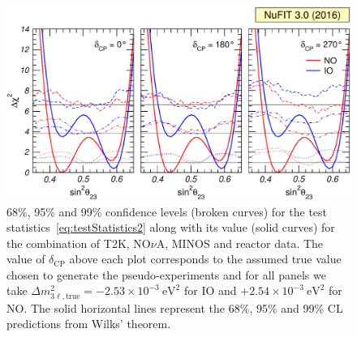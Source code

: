 \documentclass[a4paper, 11pt]{article}
\newcommand{\Dmq}{\Delta m^2}
\begin{document}
\begin{figure}\centering
  \includegraphics[width=\textwidth]{fig-probab-t23}
  \caption{68\%, 95\% and 99\% confidence levels (broken curves) for
    the test statistics~\eqref{eq:testStatistics2} along with its
    value (solid curves) for the combination of T2K, NO$\nu$A, MINOS
    and reactor data.  The value of $\delta_\text{CP}$ above each plot
    corresponds to the assumed true value chosen to generate the
    pseudo-experiments and for all panels we take
    $\Dmq_{3\ell,\text{true}} = -2.53 \times 10^{-3}~\text{eV}^2$ for
    IO and $+2.54 \times 10^{-3}~\text{eV}^2$ for NO.  The solid
    horizontal lines represent the 68\%, 95\% and 99\% CL predictions
    from Wilks' theorem.}
  \label{fig:probab-t23}
\end{figure}
\end{document}
